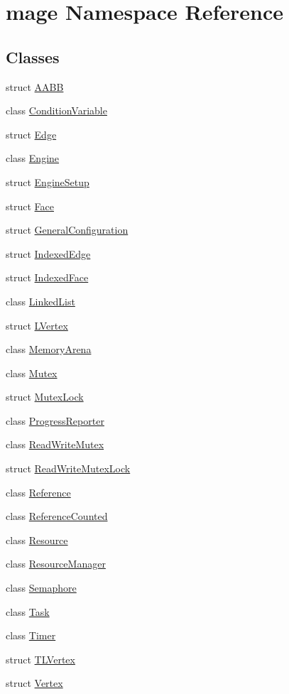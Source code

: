 \hypertarget{namespacemage}{}\section{mage Namespace Reference}
\label{namespacemage}
\subsection*{Classes}
\begin{DoxyCompactItemize}
\item 
struct \hyperlink{structmage_1_1_a_a_b_b}{A\+A\+BB}
\item 
class \hyperlink{classmage_1_1_condition_variable}{Condition\+Variable}
\item 
struct \hyperlink{structmage_1_1_edge}{Edge}
\item 
class \hyperlink{classmage_1_1_engine}{Engine}
\item 
struct \hyperlink{structmage_1_1_engine_setup}{Engine\+Setup}
\item 
struct \hyperlink{structmage_1_1_face}{Face}
\item 
struct \hyperlink{structmage_1_1_general_configuration}{General\+Configuration}
\item 
struct \hyperlink{structmage_1_1_indexed_edge}{Indexed\+Edge}
\item 
struct \hyperlink{structmage_1_1_indexed_face}{Indexed\+Face}
\item 
class \hyperlink{classmage_1_1_linked_list}{Linked\+List}
\item 
struct \hyperlink{structmage_1_1_l_vertex}{L\+Vertex}
\item 
class \hyperlink{classmage_1_1_memory_arena}{Memory\+Arena}
\item 
class \hyperlink{classmage_1_1_mutex}{Mutex}
\item 
struct \hyperlink{structmage_1_1_mutex_lock}{Mutex\+Lock}
\item 
class \hyperlink{classmage_1_1_progress_reporter}{Progress\+Reporter}
\item 
class \hyperlink{classmage_1_1_read_write_mutex}{Read\+Write\+Mutex}
\item 
struct \hyperlink{structmage_1_1_read_write_mutex_lock}{Read\+Write\+Mutex\+Lock}
\item 
class \hyperlink{classmage_1_1_reference}{Reference}
\item 
class \hyperlink{classmage_1_1_reference_counted}{Reference\+Counted}
\item 
class \hyperlink{classmage_1_1_resource}{Resource}
\item 
class \hyperlink{classmage_1_1_resource_manager}{Resource\+Manager}
\item 
class \hyperlink{classmage_1_1_semaphore}{Semaphore}
\item 
class \hyperlink{classmage_1_1_task}{Task}
\item 
class \hyperlink{classmage_1_1_timer}{Timer}
\item 
struct \hyperlink{structmage_1_1_t_l_vertex}{T\+L\+Vertex}
\item 
struct \hyperlink{structmage_1_1_vertex}{Vertex}
\end{DoxyCompactItemize}

